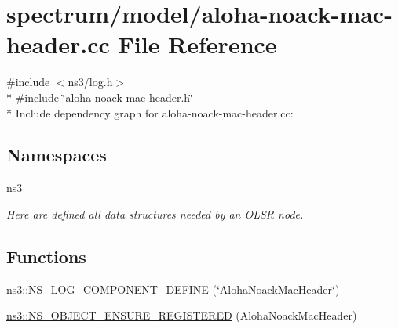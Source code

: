 \hypertarget{aloha-noack-mac-header_8cc}{}\section{spectrum/model/aloha-\/noack-\/mac-\/header.cc File Reference}
\label{aloha-noack-mac-header_8cc}
{\ttfamily \#include $<$ns3/log.\+h$>$}\\*
{\ttfamily \#include \char`\"{}aloha-\/noack-\/mac-\/header.\+h\char`\"{}}\\*
Include dependency graph for aloha-\/noack-\/mac-\/header.cc\+:
\subsection*{Namespaces}
\begin{DoxyCompactItemize}
\item 
 \hyperlink{namespacens3}{ns3}
\begin{DoxyCompactList}\small\item\em Here are defined all data structures needed by an O\+L\+SR node. \end{DoxyCompactList}\end{DoxyCompactItemize}
\subsection*{Functions}
\begin{DoxyCompactItemize}
\item 
\hyperlink{namespacens3_a66c058a5c4ebf3aef1813bed6b65f677}{ns3\+::\+N\+S\+\_\+\+L\+O\+G\+\_\+\+C\+O\+M\+P\+O\+N\+E\+N\+T\+\_\+\+D\+E\+F\+I\+NE} (\char`\"{}Aloha\+Noack\+Mac\+Header\char`\"{})
\item 
\hyperlink{namespacens3_aee8b15777e1c0b2ef5faf0e40d793d71}{ns3\+::\+N\+S\+\_\+\+O\+B\+J\+E\+C\+T\+\_\+\+E\+N\+S\+U\+R\+E\+\_\+\+R\+E\+G\+I\+S\+T\+E\+R\+ED} (Aloha\+Noack\+Mac\+Header)
\end{DoxyCompactItemize}
